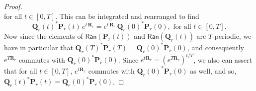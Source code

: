 \documentclass[10pt,a4paper]{amsart}
\begin{document}
\begin{proof}
\begin{equation*}
\end{equation*}
for all $t\in[0,T]$.  This can be integrated and rearranged to find $$
\mathbf{Q}_r(t)^{*}\mathbf{P}_r(t)\,e^{t\,\mathbf{R}_r}=e^{t\,\mathbf{R}_r}\,\mathbf{Q}_r(0)^{*}\mathbf{P}_r(0), \mbox{ for all } t\in[0,T].
$$    
Now since the elements of $\mathsf{Ran}(\mathbf{P}_r(t))$ and $\mathsf{Ran}(\mathbf{Q}_r(t))$ are $T$-periodic, we have in particular that $\mathbf{Q}_r(T)^{*}\mathbf{P}_r(T)=\mathbf{Q}_r(0)^{*}\mathbf{P}_r(0)$, and consequently $e^{T\mathbf{R}_{r}}$ commutes with $\mathbf{Q}_r(0)^{*}\mathbf{P}_r(0)$.  Since $e^{t\mathbf{R}_{r}}=\left(e^{T\mathbf{R}_{r}}\right)^{t/T}$, we also can assert that for all $t\in[0,T]$, $e^{t\mathbf{R}_{r}}$ commutes with $\mathbf{Q}_r(0)^{*}\mathbf{P}_r(0)$ as well, and so,  $\mathbf{Q}_r(t)^{*}\mathbf{P}_r(t)=\mathbf{Q}_r(0)^{*}\mathbf{P}_r(0)$.
\end{proof}
\end{document}
